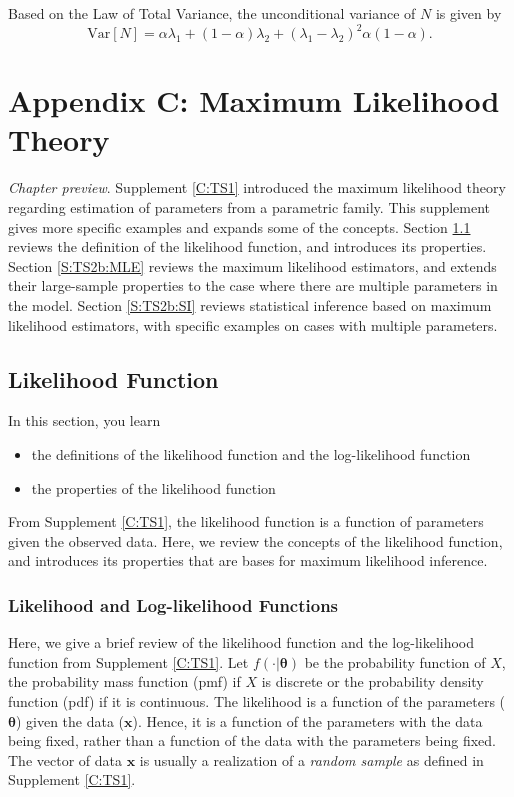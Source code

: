 \documentclass[]{book}
\providecommand{\tightlist}{%
  \setlength{\itemsep}{0pt}\setlength{\parskip}{0pt}}
\theoremstyle{definition}
\theoremstyle{definition}
\theoremstyle{definition}
\theoremstyle{remark}
\begin{document}
Based on the Law of Total Variance, the unconditional variance of \(N\)
is given by
\[\mathrm{Var}[N]= \alpha \lambda_1+ (1-\alpha) \lambda_2 + (\lambda_1-\lambda_2)^2 \alpha (1-\alpha).\]

\chapter{Appendix C: Maximum Likelihood Theory}\label{C:TS2b}

\emph{Chapter preview}. Supplement \ref{C:TS1} introduced the maximum
likelihood theory regarding estimation of parameters from a parametric
family. This supplement gives more specific examples and expands some of
the concepts. Section \ref{S:TS2b:LF} reviews the definition of the
likelihood function, and introduces its properties. Section
\ref{S:TS2b:MLE} reviews the maximum likelihood estimators, and extends
their large-sample properties to the case where there are multiple
parameters in the model. Section \ref{S:TS2b:SI} reviews statistical
inference based on maximum likelihood estimators, with specific examples
on cases with multiple parameters.

\section{Likelihood Function}\label{S:TS2b:LF}

In this section, you learn

\begin{itemize}
\tightlist
\item
  the definitions of the likelihood function and the log-likelihood
  function
\item
  the properties of the likelihood function
\end{itemize}

From Supplement \ref{C:TS1}, the likelihood function is a function of
parameters given the observed data. Here, we review the concepts of the
likelihood function, and introduces its properties that are bases for
maximum likelihood inference.

\subsection{Likelihood and Log-likelihood
Functions}\label{likelihood-and-log-likelihood-functions}

Here, we give a brief review of the likelihood function and the
log-likelihood function from Supplement \ref{C:TS1}. Let
\(f(\cdot|\boldsymbol\theta)\) be the probability function of \(X\), the
probability mass function (pmf) if \(X\) is discrete or the probability
density function (pdf) if it is continuous. The likelihood is a function
of the parameters (\(\boldsymbol \theta\)) given the data
(\(\mathbf{x}\)). Hence, it is a function of the parameters with the
data being fixed, rather than a function of the data with the parameters
being fixed. The vector of data \(\mathbf{x}\) is usually a realization
of a \emph{random sample} as defined in Supplement \ref{C:TS1}.
\end{document}
